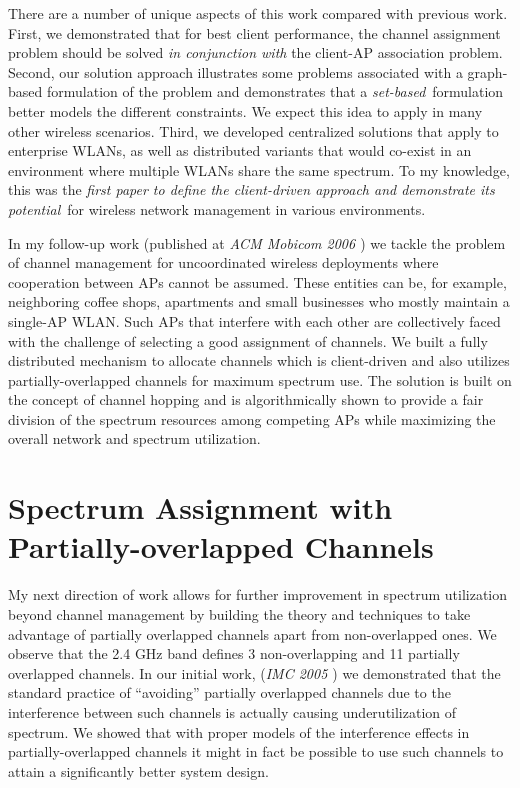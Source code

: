 \documentclass[11pt,letterpaper]{article}
\begin{document}
There are a number of unique aspects of this work compared with previous work.  First, we demonstrated that for best
client performance, the channel assignment problem should be solved {\em in conjunction with} the client-AP association
problem.  Second, our solution approach illustrates some problems associated with a graph-based formulation of the
problem and demonstrates that a {\em set-based}\ formulation better models the different constraints. We expect this
idea to apply in many other wireless scenarios.  Third, we developed centralized solutions that apply to enterprise
WLANs, as well as distributed variants that would co-exist in an environment where multiple WLANs share the same
spectrum. To my knowledge, this was the {\em first paper to define the client-driven approach and demonstrate its
potential}\ for wireless network management in various environments.

In my follow-up work (published at {\it ACM Mobicom 2006 \cite{mobicom2006}}) we tackle the problem of channel
management for  uncoordinated wireless deployments where cooperation between APs cannot be assumed. These entities can
be, for example, neighboring coffee shops, apartments and small businesses who mostly maintain a single-AP WLAN. Such
APs that interfere with each other are collectively faced with the challenge of selecting a good assignment of channels.
We built a fully distributed mechanism to allocate channels which is client-driven and also utilizes
partially-overlapped channels for maximum spectrum use. The solution is built on the concept of channel hopping and is
algorithmically shown to provide a fair division of the spectrum resources among competing APs while maximizing the
overall network and spectrum utilization.

\section{Spectrum Assignment with Partially-overlapped Channels} My next direction of work allows for further
improvement in spectrum utilization beyond channel management by building the theory and techniques to take advantage of
partially overlapped channels apart from non-overlapped ones.  We observe that the 2.4 GHz band defines 3
non-overlapping and 11 partially overlapped channels. In our initial work, ({\it IMC 2005 \cite{pov}}) we demonstrated that the
standard practice of ``avoiding'' partially overlapped channels due to the interference between such channels is
actually causing underutilization of spectrum.  We showed that with proper models of the interference effects in
partially-overlapped channels it might in fact be possible to use such channels to attain a significantly better system
design.
\end{document}
